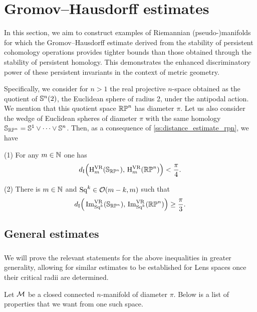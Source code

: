 
\section{Gromov--Hausdorff estimates}\label{s:gh_estimates}

In this section, we aim to construct examples of Riemannian (pseudo-)manifolds for which the Gromov--Hausdorff estimate derived from the stability of persistent cohomology operations provides tighter bounds than those obtained through the stability of persistent homology.
This demonstrates the enhanced discriminatory power of these persistent invariants in the context of metric geometry.

Specifically, we consider for \(n > 1\) the real projective \(n\)-space obtained as the quotient of \(\mathbb{S}^n(2)\), the Euclidean sphere of radius 2, under the antipodal action.
We mention that this quotient space \(\mathbb{RP}^n\) has diameter \(\pi\).
Let us also consider the wedge of Euclidean spheres of diameter \(\pi\) with the same homology \(\mathbb{S}_{\mathbb{RP}^n} = \mathbb{S}^1 \vee \dots \vee \mathbb{S}^n\).
Then, as a consequence of \cref{ss:distance_estimate_rpn}, we have

\medskip (1) For any \(m \in \mathbb{N}\) one has
\[
d_{\mathrm{I}}\Big(\mathrm{H}^{\mathrm{VR}}_m(\mathbb{S}_{\mathbb{RP}^n}),\, \mathrm{H}^{\mathrm{VR}}_m(\mathbb{RP}^n)\Big) < \frac{\pi}{4}.
\]

(2) There is \(m \in \mathbb{N}\) and \(\mathrm{Sq}^k \in \mathcal{O}(m-k, m)\) such that
\[
d_{\mathrm{I}}\Big(\operatorname{Im}_{\mathrm{Sq}^k}^{\mathrm{VR}}(\mathbb{S}_{\mathbb{RP}^n}),\, \operatorname{Im}_{\mathrm{Sq}^k}^{\mathrm{VR}}(\mathbb{RP}^n)\Big) \geq \frac{\pi}{3}.
\]

\subsection{General estimates}\label{ss:genberal_distance_comparison}

\subsubsection{}

We will prove the relevant statements for the above inequalities in greater generality, allowing for similar estimates to be established for Lens spaces once their critical radii are determined.

Let $\mathcal{M}$ be a closed connected \(n\)-manifold of diameter $\pi$.
Below is a list of properties that we want from one such space.

